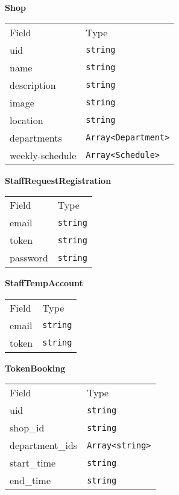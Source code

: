     \begin{table}[H]
    \centering
    \textbf{Shop}\\
    \everyrow{\tabucline[0.5pt]-}
    \begin{tabu} to 0.55\textwidth {|X|X|} \hline
    Field & Type \\
    uid & \texttt{string} \\
name & \texttt{string} \\
description & \texttt{string} \\
image & \texttt{string} \\
location & \texttt{string} \\
departments & \texttt{Array<Department>} \\
weekly-schedule & \texttt{Array<Schedule>} \\
\end{tabu}
\end{table}


    \begin{table}[H]
    \centering
    \textbf{StaffRequestRegistration}\\
    \everyrow{\tabucline[0.5pt]-}
    \begin{tabu} to 0.55\textwidth {|X|X|} \hline
    Field & Type \\
    email & \texttt{string} \\
token & \texttt{string} \\
password & \texttt{string} \\
\end{tabu}
\end{table}


    \begin{table}[H]
    \centering
    \textbf{StaffTempAccount}\\
    \everyrow{\tabucline[0.5pt]-}
    \begin{tabu} to 0.55\textwidth {|X|X|} \hline
    Field & Type \\
    email & \texttt{string} \\
token & \texttt{string} \\
\end{tabu}
\end{table}


    \begin{table}[H]
    \centering
    \textbf{TokenBooking}\\
    \everyrow{\tabucline[0.5pt]-}
    \begin{tabu} to 0.55\textwidth {|X|X|} \hline
    Field & Type \\
    uid & \texttt{string} \\
shop\_id & \texttt{string} \\
department\_ids & \texttt{Array<string>} \\
start\_time & \texttt{string} \\
end\_time & \texttt{string} \\
\end{tabu}
\end{table}


